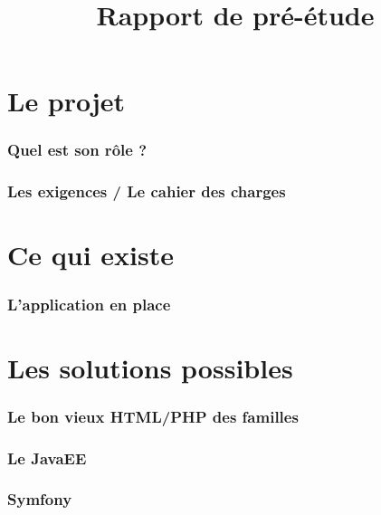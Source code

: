 \documentclass[10pt,a4paper]{article}
\title{Rapport de pré-étude}
\begin{document}
	\part{Le projet}
	
		\section{Quel est son rôle ?}
		\section{Les exigences / Le cahier des charges}
	
	\part{Ce qui existe}
	
		\section{L'application en place}
	
	\part{Les solutions possibles}
		
		\section{Le bon vieux HTML/PHP des familles}
		\section{Le JavaEE}
		\section{Symfony}
		
\end{document}
